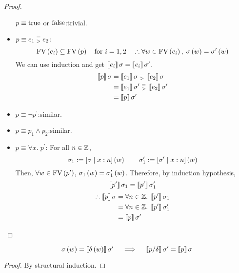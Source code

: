 \begin{enumcirc}
\begin{proof}
\begin{itemize}
			      $p \equiv \textrm{true}$ or $\textrm{false}$:\quad trivial.
			\item
			      $p \equiv e_1 \;\substack{=\\>}\; e_2$:
			      \[
				      \textrm{FV}\left(  e_i  \right) \subseteq \textrm{FV}\left(  p  \right) \quad \textrm{for } i = 1, 2 \quad
				      \therefore \forall w \in \textrm{FV}\left(  e_i  \right), \; \sigma\left( w \right) = \sigma^\prime\left( w \right)
			      \]
			      We can use induction and get
			      $ \left\llbracket e_i \right\rrbracket\sigma = \left\llbracket e_i \right\rrbracket\sigma^\prime $.
			      \begin{align*}
				      \left\llbracket p \right\rrbracket\sigma & = \left\llbracket e_1 \right\rrbracket\sigma \;\substack{=\\>}\; \left\llbracket e_2 \right\rrbracket\sigma               \\
				                          & = \left\llbracket e_1 \right\rrbracket\sigma^\prime \;\substack{=\\>}\; \left\llbracket e_2 \right\rrbracket\sigma^\prime \\
				                          & = \left\llbracket p \right\rrbracket\sigma^\prime
			      \end{align*}
			\item
			      $p \equiv \neg p^\prime$:\quad similar.
			\item
			      $p \equiv p_1 \wedge p_2$:\quad similar.
			\item
			      $p \equiv \forall x .\; p^\prime$:\quad
			      For all $n \in \mathbb{Z}$,
			      \[
				      \sigma_1 := \left[ \sigma \; \middle\vert \; x:n \right]\left( w \right) \qquad \sigma_1^\prime := \left[ \sigma^\prime \; \middle\vert \; x:n \right]\left( w \right)
			      \]
			      Then, $\forall w \in \textrm{FV}\left(  p^\prime  \right)$,
			      $\sigma_1\left( w \right) = \sigma_1^\prime\left( w \right)$.
			      Therefore, by induction hypothesis,
			      \[
				      \left\llbracket p^\prime \right\rrbracket\sigma_1 = \left\llbracket p^\prime \right\rrbracket\sigma_1^\prime
			      \]
			      \begin{align*}
				      \therefore \left\llbracket p \right\rrbracket\sigma & = \forall n \in \mathbb{Z} .\; \left\llbracket p^\prime \right\rrbracket\sigma_1        \\
				                                     & = \forall n \in \mathbb{Z} .\; \left\llbracket p^\prime \right\rrbracket\sigma_1^\prime \\
				                                     & = \left\llbracket p \right\rrbracket\sigma^\prime
			      \end{align*}
		\end{itemize}
	\end{proof}

	\begin{property}[Substitution]
		\[
			\sigma\left( w \right) = \left\llbracket \delta\left( w \right) \right\rrbracket\sigma^\prime
			\quad \implies \quad \left\llbracket p/\delta \right\rrbracket\sigma^\prime = \left\llbracket p \right\rrbracket\sigma
		\]
	\end{property}
	\begin{proof}
		By structural induction.
	\end{proof}


\end{enumcirc}
